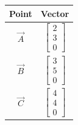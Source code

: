 \begin{center}
\begin{tabular}{|c|c|}
\hline
Point & Vector \\
\hline
$\vec{A}$ & $\begin{bmatrix} 2 \\ 3 \\ 0 \end{bmatrix}$ \\
\hline
$\vec{B}$ & $\begin{bmatrix} 3 \\ 5 \\ 0 \end{bmatrix}$ \\
\hline
$\vec{C}$ & $\begin{bmatrix} 4 \\ 4 \\ 0 \end{bmatrix}$ \\
\hline
\end{tabular}
\end{center}